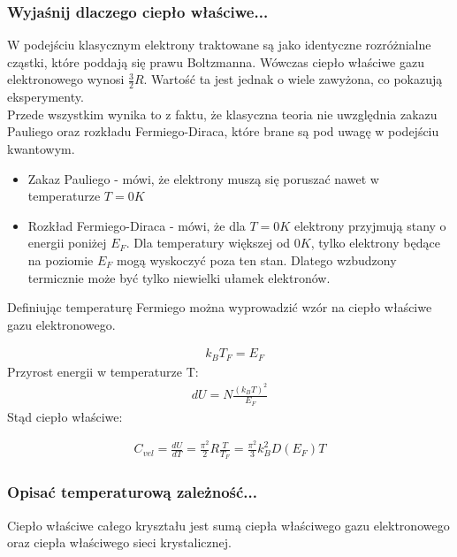 \documentclass[a4paper,15pt]{article}
\begin{document}
\subsubsection{Wyjaśnij dlaczego ciepło właściwe...}

W podejściu klasycznym elektrony traktowane są jako identyczne rozróżnialne cząstki, które poddają się prawu Boltzmanna. Wówczas ciepło właściwe gazu elektronowego wynosi $\frac{3}{2}R$. Wartość ta jest jednak o wiele zawyżona, co pokazują eksperymenty. \\

Przede wszystkim wynika to z faktu, że klasyczna teoria nie uwzględnia zakazu Pauliego oraz rozkładu Fermiego-Diraca, które brane są pod uwagę w podejściu kwantowym. \\


\begin{itemize}
\item Zakaz Pauliego - mówi, że elektrony muszą się poruszać nawet w temperaturze $T = 0 K$
\item Rozkład Fermiego-Diraca - mówi, że dla $T = 0 K$ elektrony przyjmują stany o energii poniżej $E_F$. Dla temperatury większej od $0 K$, tylko elektrony będące na poziomie $E_F$ mogą wyskoczyć poza ten stan. Dlatego wzbudzony termicznie może być tylko niewielki ułamek elektronów.  
\end{itemize}

Definiując temperaturę Fermiego można wyprowadzić wzór na ciepło właściwe gazu elektronowego. 

\begin{align*}
& k_B T_F = E_F
\end{align*}
Przyrost energii w temperaturze T:
\begin{align*}
dU = N\frac{(k_B T)^2}{E_F}
\end{align*}
Stąd ciepło właściwe:

\begin{align*}
C_{vel} = \frac{dU}{dT} = \frac{\pi ^2}{2}R\frac{T}{T_F} = \frac{\pi ^2}{3}k^2_BD(E_F)T
\end{align*} 
  

\subsubsection{ Opisać temperaturową zależność... }

Ciepło właściwe całego kryształu jest sumą ciepła właściwego gazu elektronowego oraz ciepła właściwego sieci krystalicznej. 
\end{document}
